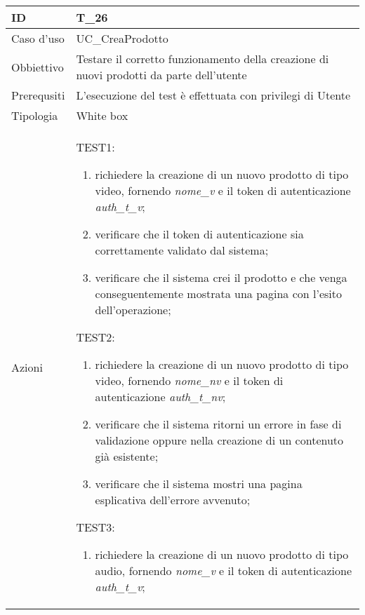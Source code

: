 \begin{table}[hb]
    \centering
    \begin{tabular}{ |p{2cm}|p{10cm}|  }
        \hline
        ID          & T\_26                                                                      \\\hline
        Caso d'uso  & UC\_CreaProdotto                                                      \\\hline
        Obbiettivo  & Testare il corretto funzionamento della creazione di nuovi prodotti da parte dell'utente  \\\hline
        Prerequsiti & L'esecuzione del test è effettuata con privilegi di Utente                 \\\hline
        Tipologia   & White box                                                                  \\\hline
        Azioni      &
        TEST1:
        \begin{enumerate}[nosep, topsep=0pt]
            \item richiedere la creazione di un nuovo prodotto di tipo video, fornendo \emph{nome\_v} e il token di autenticazione \emph{auth\_t\_v};
            \item verificare che il token di autenticazione sia correttamente validato dal sistema;
            \item verificare che il sistema crei il prodotto e che venga conseguentemente mostrata una pagina con l'esito dell'operazione;
        \end{enumerate}
        \vspace{0.5cm} TEST2:
        \begin{enumerate}[nosep, topsep=0pt]
            \item richiedere la creazione di un nuovo prodotto di tipo video, fornendo \emph{nome\_nv} e il token di autenticazione \emph{auth\_t\_nv};
            \item verificare che il sistema ritorni un errore in fase di validazione oppure nella creazione di un contenuto già esistente;
            \item verificare che il sistema mostri una pagina esplicativa dell'errore avvenuto;
        \end{enumerate}
        \vspace{0.5cm}
        TEST3:
        \begin{enumerate}[nosep, topsep=0pt]
            \item richiedere la creazione di un nuovo prodotto di tipo audio, fornendo \emph{nome\_v} e il token di autenticazione \emph{auth\_t\_v};

\end{enumerate}
\end{tabular}
\end{table}
